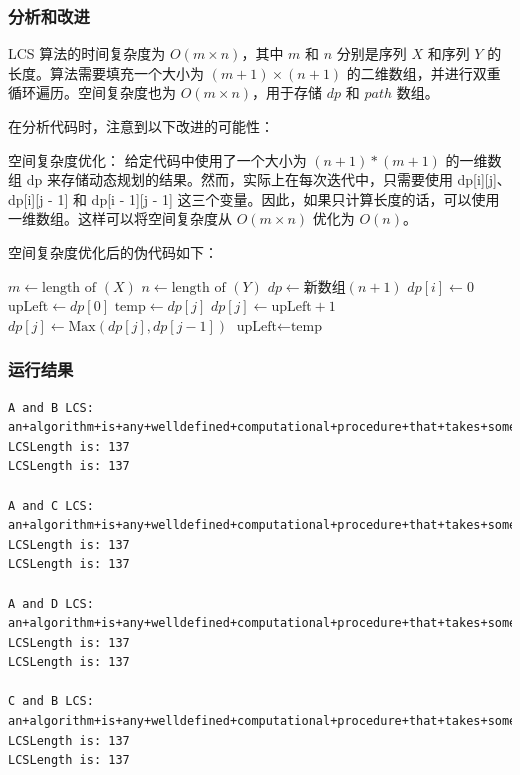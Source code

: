 \documentclass[lang=cn,11pt,a4paper]{elegantpaper}
\begin{document}
\subsubsection{分析和改进}
LCS 算法的时间复杂度为 $O(m \times n)$，其中 $m$ 和 $n$ 分别是序列 $X$ 和序列 $Y$ 的长度。算法需要填充一个大小为 $(m+1) \times (n+1)$ 的二维数组，并进行双重循环遍历。空间复杂度也为 $O(m \times n)$，用于存储 $dp$ 和 $path$ 数组。

在分析代码时，注意到以下改进的可能性：

空间复杂度优化： 给定代码中使用了一个大小为 $(n+1)*(m+1)$ 的一维数组 dp 来存储动态规划的结果。然而，实际上在每次迭代中，只需要使用 dp[i][j]、dp[i][j - 1] 和 dp[i - 1][j - 1] 这三个变量。因此，如果只计算长度的话，可以使用一维数组。这样可以将空间复杂度从 $O(m \times n)$ 优化为 $O(n)$。

空间复杂度优化后的伪代码如下：

\begin{algorithm}[h]
\caption{计算最长公共子序列长度（空间复杂度O(n)）}
\begin{algorithmic}[1]
    \State $m \gets \text{length of }(X)$
    \State $n \gets \text{length of }(Y)$
    \State $dp \gets \text{新数组}(n + 1)$
        \State $dp[i] \gets 0$
    \EndFor
        \State $\text{upLeft} \gets dp[0]$ 
            \State $\text{temp} \gets dp[j]$ 
                \State $dp[j] \gets \text{upLeft} + 1$
            \Else
                \State $dp[j] \gets \text{Max}(dp[j], dp[j - 1])$
            \EndIf
            \State $\text{upLeft} \gets \text{temp}$ 
        \EndFor
    \EndFor
\EndProcedure
\end{algorithmic}
\end{algorithm}

\subsubsection{运行结果}
\begin{lstlisting}[language=text]
A and B LCS:
an+algorithm+is+any+welldefined+computational+procedure+that+takes+some+values+as+input+and+produces+some+values+as+output20212113xx2023
LCSLength is: 137
LCSLength is: 137

A and C LCS:
an+algorithm+is+any+welldefined+computational+procedure+that+takes+some+values+as+input+and+produces+some+values+as+output20212113xx2023
LCSLength is: 137
LCSLength is: 137

A and D LCS:
an+algorithm+is+any+welldefined+computational+procedure+that+takes+some+values+as+input+and+produces+some+values+as+output20212113xx2023
LCSLength is: 137
LCSLength is: 137

C and B LCS:
an+algorithm+is+any+welldefined+computational+procedure+that+takes+some+values+as+input+and+produces+some+values+as+output20212113xx2023
LCSLength is: 137
LCSLength is: 137
\end{lstlisting}
\end{document}
